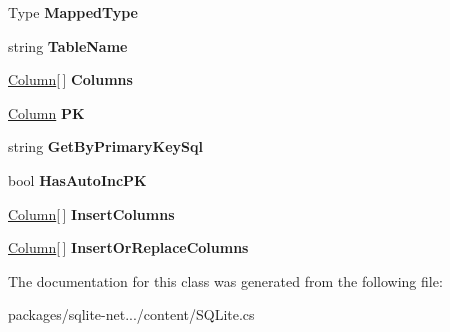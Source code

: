 \begin{DoxyCompactItemize}
\item 
\hypertarget{classSQLite_1_1TableMapping_ac3c793957da246bf4e238c53a4a43794}{Type {\bfseries Mapped\-Type}}\label{classSQLite_1_1TableMapping_ac3c793957da246bf4e238c53a4a43794}

\item 
\hypertarget{classSQLite_1_1TableMapping_a800f58389d0bb8e84382f6343a526d9f}{string {\bfseries Table\-Name}}\label{classSQLite_1_1TableMapping_a800f58389d0bb8e84382f6343a526d9f}

\item 
\hypertarget{classSQLite_1_1TableMapping_ae108c0714634387100fccf5001b73672}{\hyperlink{classSQLite_1_1TableMapping_1_1Column}{Column}\mbox{[}$\,$\mbox{]} {\bfseries Columns}}\label{classSQLite_1_1TableMapping_ae108c0714634387100fccf5001b73672}

\item 
\hypertarget{classSQLite_1_1TableMapping_a25188f12d17e1fe26bbf63b5e59657bf}{\hyperlink{classSQLite_1_1TableMapping_1_1Column}{Column} {\bfseries P\-K}}\label{classSQLite_1_1TableMapping_a25188f12d17e1fe26bbf63b5e59657bf}

\item 
\hypertarget{classSQLite_1_1TableMapping_a43e3f1135c3bc68a89535ba733531f88}{string {\bfseries Get\-By\-Primary\-Key\-Sql}}\label{classSQLite_1_1TableMapping_a43e3f1135c3bc68a89535ba733531f88}

\item 
\hypertarget{classSQLite_1_1TableMapping_a3ed50c08912cc31d9a0036d94798c16f}{bool {\bfseries Has\-Auto\-Inc\-P\-K}}\label{classSQLite_1_1TableMapping_a3ed50c08912cc31d9a0036d94798c16f}

\item 
\hypertarget{classSQLite_1_1TableMapping_a07daa9501f45c3a52cd834cb65fa86a2}{\hyperlink{classSQLite_1_1TableMapping_1_1Column}{Column}\mbox{[}$\,$\mbox{]} {\bfseries Insert\-Columns}}\label{classSQLite_1_1TableMapping_a07daa9501f45c3a52cd834cb65fa86a2}

\item 
\hypertarget{classSQLite_1_1TableMapping_ac88c964d9ed3ad2c6827ccfbe8765187}{\hyperlink{classSQLite_1_1TableMapping_1_1Column}{Column}\mbox{[}$\,$\mbox{]} {\bfseries Insert\-Or\-Replace\-Columns}}\label{classSQLite_1_1TableMapping_ac88c964d9ed3ad2c6827ccfbe8765187}

\end{DoxyCompactItemize}


The documentation for this class was generated from the following file\-:\begin{DoxyCompactItemize}
\item 
packages/sqlite-\/net.../content/S\-Q\-Lite.\-cs\end{DoxyCompactItemize}

